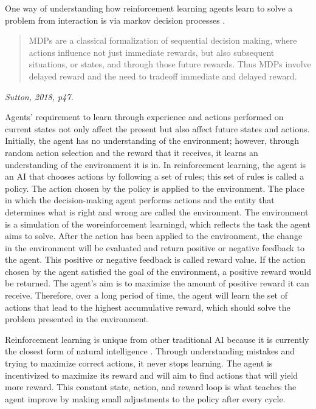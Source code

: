 One way of understanding how reinforcement learning agents learn to solve a problem from interaction is via markov decision processes \cite{Sutton1}.

\begin{quote}
MDPs are a classical formalization of sequential decision making,
where actions influence not just immediate rewards, but also subsequent situations, or
states, and through those future rewards. Thus MDPs involve delayed reward and the
need to tradeoff immediate and delayed reward.
\end{quote}
\hspace*{\fill} \textit{Sutton, 2018, p47.}

Agents' requirement to learn through experience and actions performed on current states not only affect the present but also affect future states and actions. Initially, the agent has no understanding of the environment; however, through random action selection and the reward that it receives, it learns an understanding of the environment it is in. In reinforcement learning, the agent is an AI that chooses actions by following a set of rules; this set of rules is called a policy. The action chosen by the policy is applied to the environment. The place in which the decision-making agent performs actions and the entity that determines what is right and wrong are called the environment. The environment is a simulation of the woreinforcement learningd, which reflects the task the agent aims to solve. After the action has been applied to the environment, the change in the environment will be evaluated and return positive or negative feedback to the agent. This positive or negative feedback is called reward value. If the action chosen by the agent satisfied the goal of the environment, a positive reward would be returned. The agent’s aim is to maximize the amount of positive reward it can receive. Therefore, over a long period of time, the agent will learn the set of actions that lead to the highest accumulative reward, which should solve the problem presented in the environment. 

Reinforcement learning is unique from other traditional AI because it is currently the closest form of natural intelligence \cite{Sutton1}. Through understanding mistakes and trying to maximize correct actions, it never stops learning. The agent is incentivized to maximize its reward and will aim to find actions that will yield more reward. This constant state, action, and reward loop is what teaches the agent improve by making small adjustments to the policy after every cycle. 

